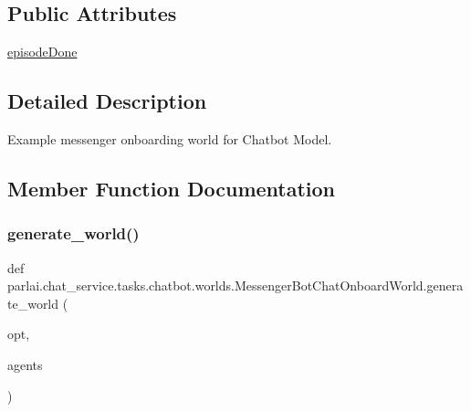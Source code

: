\subsection*{Public Attributes}
\begin{DoxyCompactItemize}
\item 
\hyperlink{classparlai_1_1chat__service_1_1tasks_1_1chatbot_1_1worlds_1_1MessengerBotChatOnboardWorld_afbc08c61e0d6b544f67d9b91f849e380}{episode\+Done}
\end{DoxyCompactItemize}


\subsection{Detailed Description}
\begin{DoxyVerb}Example messenger onboarding world for Chatbot Model.
\end{DoxyVerb}
 

\subsection{Member Function Documentation}
\mbox{\label{classparlai_1_1chat__service_1_1tasks_1_1chatbot_1_1worlds_1_1MessengerBotChatOnboardWorld_aa9eda82599dfd4735b207fbf5434251f}} 
\subsubsection{\texorpdfstring{generate\+\_\+world()}{generate\_world()}}
{\footnotesize\ttfamily def parlai.\+chat\+\_\+service.\+tasks.\+chatbot.\+worlds.\+Messenger\+Bot\+Chat\+Onboard\+World.\+generate\+\_\+world (\begin{DoxyParamCaption}\item[{}]{opt,  }\item[{}]{agents }\end{DoxyParamCaption})\hspace{0.3cm}{\ttfamily [static]}}

